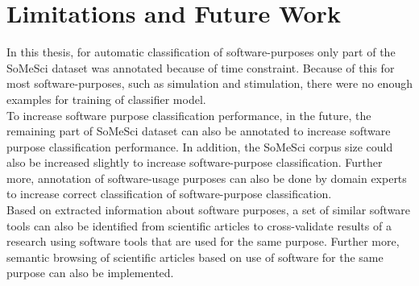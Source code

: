\section{Limitations and Future Work}
\label{sec:chapter07:futurework}

In this thesis, for automatic classification of software-purposes only part of the \ac{SoMeSci} dataset was annotated because of time constraint. Because of this for most software-purposes, such as simulation and stimulation, there were no enough examples for training of classifier model. \\

To increase software purpose classification performance, in the future, the remaining part of SoMeSci dataset can also be annotated to increase software purpose classification performance. In addition, the SoMeSci corpus size could also be increased slightly to increase software-purpose classification. Further more, annotation of software-usage purposes can also be done by domain experts to increase correct classification of software-purpose classification. \\

Based on extracted information about software purposes, a set of similar software tools can also be identified from scientific articles to cross-validate results of a research using software tools that are used for the same purpose. Further more, semantic browsing of scientific articles based on use of software for the same purpose can also be implemented. 




